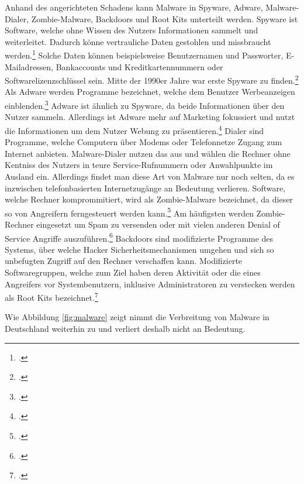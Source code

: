 Anhand des angerichteten Schadens kann Malware in Spyware, Adware, Malware-Dialer, Zombie-Malware, Backdoors und Root Kits unterteilt werden. Spyware ist Software, welche ohne Wissen des Nutzers Informationen sammelt und weiterleitet. Dadurch könne vertrauliche Daten gestohlen und missbraucht werden.\footcite[Vgl.][95\psq]{netzwerkDatensicherheit} Solche Daten können beispielsweise Benutzernamen und Passworter, E-Mailadressen, Bankaccounts und Kreditkartennummern oder Softwarelizenzschlüssel sein. Mitte der 1990er Jahre war erste Spyware zu finden.\footcite[Vgl.][16]{virusesMalware} Als Adware werden Programme bezeichnet, welche dem Benutzer Werbeanzeigen einblenden.\footcite[Vgl.][96]{netzwerkDatensicherheit} Adware ist ähnlich zu Spyware, da beide Informationen über den Nutzer sammeln. Allerdings ist Adware mehr auf Marketing fokussiert und nutzt die Informationen um dem Nutzer Webung zu präsentieren.\footcite[Vgl.][17]{virusesMalware} Dialer sind Programme, welche Computern über Modems oder Telefonnetze Zugang zum Internet anbieten. Malware-Dialer nutzen das aus und wählen die Rechner ohne Kentniss des Nutzers in teure Service-Rufnummern oder Anwahlpunkte im Ausland ein. Allerdings findet man diese Art von Malware nur noch selten, da es inzwischen telefonbasierten Internetzugänge an Bedeutung verlieren. Software, welche Rechner komprommitiert, wird als Zombie-Malware bezeichnet, da dieser so von Angreifern ferngesteuert werden kann.\footcite[Vgl.][96]{netzwerkDatensicherheit} Am häufigsten werden Zombie-Rechner eingesetzt um Spam zu versenden oder mit vielen anderen Denial of Service Angriffe auszuführen.\footcite[Vgl.][18]{virusesMalware} Backdoors sind modifizierte Programme des Systems, über welche Hacker Sicherheitsmechanismen umgehen und sich so unbefugten Zugriff auf den Rechner verschaffen kann. Modifizierte Softwaregruppen, welche zum Ziel haben deren Aktivität oder die eines Angreifers vor Systembenutzern, inklusive Administratoren zu verstecken werden als Root Kits bezeichnet.\footcite[Vgl.][96]{netzwerkDatensicherheit}

Wie Abbildung \ref{fig:malware} zeigt nimmt die Verbreitung von Malware in Deutschland weiterhin zu und verliert deshalb nicht an Bedeutung.

